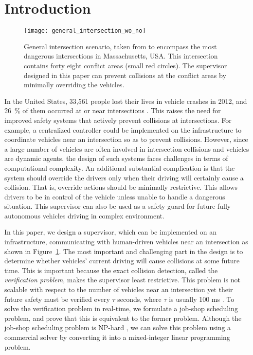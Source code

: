 \documentclass{sig-alternate}
\begin{document}


\section{Introduction}
\begin{figure}[t!]
\centering
\texttt{[image: general\_intersection\_wo\_no]}
\caption{General intersection scenario, taken from \cite{MassDOT_2012_Topcrash} to encompass the most dangerous intersections in Massachusetts, USA. This intersection contains forty eight conflict areas (small red circles). The supervisor designed in this paper can prevent collisions at the conflict areas by minimally overriding the vehicles.}
\label{figure:general_intersection}
\end{figure}

In the United States, 33,561 people lost their lives in vehicle crashes in 2012, and 26~\% of them occurred at or near intersections \cite{US_DOT_2012:overview}. This raises the need for improved safety systems that actively prevent collisions at intersections. For example, a centralized controller could be implemented on the infrastructure to coordinate vehicles near an intersection so as to prevent collisions. However, since a large number of vehicles are often involved in intersection collisions and vehicles are dynamic agents, the design of such systems faces challenges in terms of computational complexity. An additional substantial complication is that the system should override the drivers only when their driving will certainly cause a collision. That is, override actions should be minimally restrictive. This allows drivers to be in control of the vehicle unless unable to handle a dangerous situation. This supervisor can also be used as a safety guard for future fully autonomous vehicles driving in complex environment.

In this paper, we design a supervisor, which can be implemented on an infrastructure, communicating with human-driven vehicles near an intersection as shown in Figure~\ref{figure:general_intersection}. The most important and challenging part in the design is to determine whether vehicles' current driving will cause collisions at some future time. This is important because the exact collision detection, called the \textit{verification problem}, makes the supervisor least restrictive. This problem is not scalable with respect to the number of vehicles near an intersection yet their future safety must be verified every $\tau$ seconds, where $\tau$ is usually 100 ms \cite{US_plan_2015_2019}. To solve the verification problem in real-time, we formulate a job-shop scheduling problem, and prove that this is equivalent to the former problem. Although the job-shop scheduling problem is NP-hard \cite{garey_computers_1979}, we can solve this problem using a commercial solver by converting it into a mixed-integer linear programming problem. 
\end{document}
